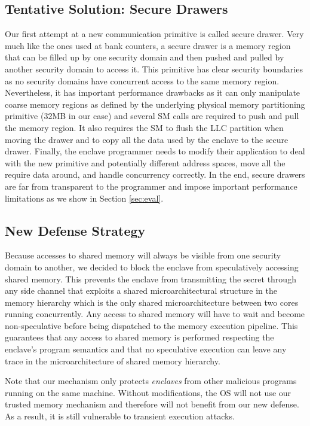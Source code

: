 \subsection{Tentative Solution: Secure Drawers}
\label{sec:secdrawer}
Our first attempt at a new communication primitive is called secure drawer.
Very much like the ones used at bank counters, a secure drawer is a memory region that can be filled up by one security domain and then pushed and pulled by another security domain to access it.
This primitive has clear security boundaries as no security domains have concurrent access to the same memory region.
Nevertheless, it has important performance drawbacks as it can only manipulate coarse memory regions as defined by the underlying physical memory partitioning primitive (32MB in our case) and several SM calls are required to push and pull the memory region.
It also requires the SM to flush the LLC partition when moving the drawer and to copy all the data used by the enclave to the secure drawer.
Finally, the enclave programmer needs to modify their application to deal with the new primitive and potentially different address spaces, move all the require data around, and handle concurrency correctly.
In the end, secure drawers are far from transparent to the programmer and impose important performance limitations as we show in Section \ref{sec:eval}.


\subsection{New Defense Strategy}

Because accesses to shared memory will always be visible from one security domain to another, we decided to block the enclave from speculatively accessing shared memory.
This prevents the enclave from transmitting the secret through any side channel that exploits a shared microarchitectural structure in the memory hierarchy which is the only shared microarchitecture between two cores running concurrently.
Any access to shared memory will have to wait and become non-speculative before being dispatched to the memory execution pipeline.
This guarantees that any access to shared memory is performed respecting the enclave's program semantics and that no speculative execution can leave any trace in the microarchitecture of shared memory hierarchy.

Note that our mechanism only protects \emph{enclaves} from other malicious programs running on the same machine.
Without modifications, the OS will not use our trusted memory mechanism and therefore will not benefit from our new defense.
As a result, it is still vulnerable to transient execution attacks.

